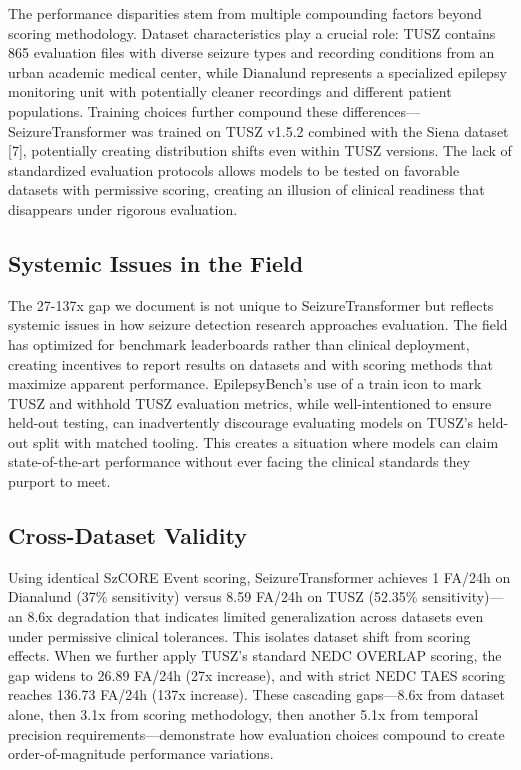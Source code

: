 The performance disparities stem from multiple compounding factors
beyond scoring methodology. Dataset characteristics play a crucial role:
TUSZ contains 865 evaluation files with diverse seizure types and
recording conditions from an urban academic medical center, while
Dianalund represents a specialized epilepsy monitoring unit with
potentially cleaner recordings and different patient populations.
Training choices further compound these differences---SeizureTransformer
was trained on TUSZ v1.5.2 combined with the Siena dataset {[}7{]},
potentially creating distribution shifts even within TUSZ versions. The
lack of standardized evaluation protocols allows models to be tested on
favorable datasets with permissive scoring, creating an illusion of
clinical readiness that disappears under rigorous evaluation.

\hypertarget{systemic-issues-in-the-field}{%
\subsection{Systemic Issues in the
Field}\label{systemic-issues-in-the-field}}

The 27-137x gap we document is not unique to SeizureTransformer but
reflects systemic issues in how seizure detection research approaches
evaluation. The field has optimized for benchmark leaderboards rather
than clinical deployment, creating incentives to report results on
datasets and with scoring methods that maximize apparent performance.
EpilepsyBench's use of a train icon to mark TUSZ and withhold TUSZ
evaluation metrics, while well-intentioned to ensure held-out testing,
can inadvertently discourage evaluating models on TUSZ's held-out split
with matched tooling. This creates a situation where models can claim
state-of-the-art performance without ever facing the clinical standards
they purport to meet.

\hypertarget{cross-dataset-validity}{%
\subsection{Cross-Dataset Validity}\label{cross-dataset-validity}}

Using identical SzCORE Event scoring, SeizureTransformer achieves 1
FA/24h on Dianalund (37\% sensitivity) versus 8.59 FA/24h on TUSZ
(52.35\% sensitivity)---an 8.6x degradation that indicates limited
generalization across datasets even under permissive clinical
tolerances. This isolates dataset shift from scoring effects. When we
further apply TUSZ's standard NEDC OVERLAP scoring, the gap widens to
26.89 FA/24h (27x increase), and with strict NEDC TAES scoring reaches
136.73 FA/24h (137x increase). These cascading gaps---8.6x from dataset
alone, then 3.1x from scoring methodology, then another 5.1x from
temporal precision requirements---demonstrate how evaluation choices
compound to create order-of-magnitude performance variations.


